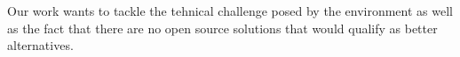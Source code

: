 
Our work wants to tackle the tehnical challenge posed by the environment 
as well as the fact that there are no open source solutions that would qualify
as better alternatives.
